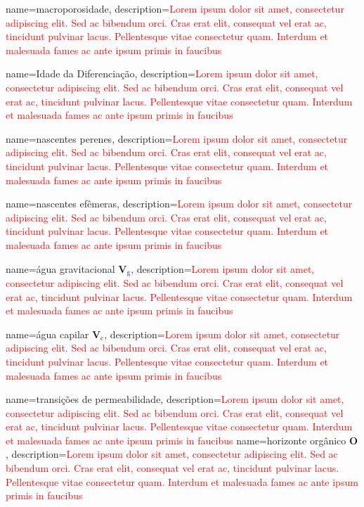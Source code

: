 {
    name=macroporosidade,
    description={\textcolor{red}{Lorem ipsum dolor sit amet, consectetur adipiscing elit. Sed ac bibendum orci. Cras erat elit, consequat vel erat ac, tincidunt pulvinar lacus. Pellentesque vitae consectetur quam. Interdum et malesuada fames ac ante ipsum primis in faucibus}}
}

{
    name=Idade da Diferenciação,
    description={\textcolor{red}{Lorem ipsum dolor sit amet, consectetur adipiscing elit. Sed ac bibendum orci. Cras erat elit, consequat vel erat ac, tincidunt pulvinar lacus. Pellentesque vitae consectetur quam. Interdum et malesuada fames ac ante ipsum primis in faucibus}}
}

{
    name=nascentes perenes,
    description={\textcolor{red}{Lorem ipsum dolor sit amet, consectetur adipiscing elit. Sed ac bibendum orci. Cras erat elit, consequat vel erat ac, tincidunt pulvinar lacus. Pellentesque vitae consectetur quam. Interdum et malesuada fames ac ante ipsum primis in faucibus}}
}

{
    name=nascentes efêmeras,
    description={\textcolor{red}{Lorem ipsum dolor sit amet, consectetur adipiscing elit. Sed ac bibendum orci. Cras erat elit, consequat vel erat ac, tincidunt pulvinar lacus. Pellentesque vitae consectetur quam. Interdum et malesuada fames ac ante ipsum primis in faucibus}}
}

{
    name=água gravitacional $\textbf{V}_{\text{g}}$,
    description={\textcolor{red}{Lorem ipsum dolor sit amet, consectetur adipiscing elit. Sed ac bibendum orci. Cras erat elit, consequat vel erat ac, tincidunt pulvinar lacus. Pellentesque vitae consectetur quam. Interdum et malesuada fames ac ante ipsum primis in faucibus}}
}

{
    name=água capilar $\textbf{V}_{\text{c}}$,
    description={\textcolor{red}{Lorem ipsum dolor sit amet, consectetur adipiscing elit. Sed ac bibendum orci. Cras erat elit, consequat vel erat ac, tincidunt pulvinar lacus. Pellentesque vitae consectetur quam. Interdum et malesuada fames ac ante ipsum primis in faucibus}}
}

{
    name=transições de permeabilidade,
    description={\textcolor{red}{Lorem ipsum dolor sit amet, consectetur adipiscing elit. Sed ac bibendum orci. Cras erat elit, consequat vel erat ac, tincidunt pulvinar lacus. Pellentesque vitae consectetur quam. Interdum et malesuada fames ac ante ipsum primis in faucibus}}
}
{
    name=horizonte orgânico $\textbf{O}$,
    description={\textcolor{red}{Lorem ipsum dolor sit amet, consectetur adipiscing elit. Sed ac bibendum orci. Cras erat elit, consequat vel erat ac, tincidunt pulvinar lacus. Pellentesque vitae consectetur quam. Interdum et malesuada fames ac ante ipsum primis in faucibus}}
}

